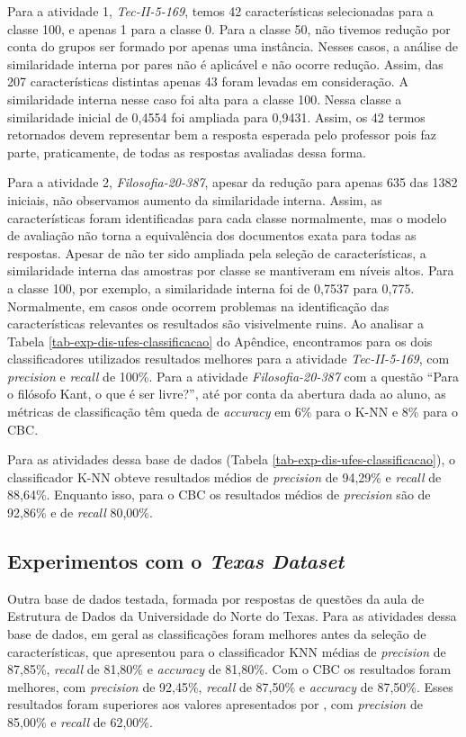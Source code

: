 Para a atividade 1, \textit{Tec-II-5-169}, temos  42 características selecionadas para a classe 100, e apenas 1 para a classe 0. Para a classe 50, não tivemos redução por conta do grupos ser formado por apenas uma instância. Nesses casos, a análise de similaridade interna por pares não é aplicável e não ocorre redução. Assim, das 207 características distintas apenas 43 foram levadas em consideração. A similaridade interna nesse caso foi alta para a classe 100. Nessa classe a similaridade inicial de 0,4554 foi ampliada para 0,9431. Assim, os 42 termos retornados devem representar bem a resposta esperada pelo professor pois faz parte, praticamente, de todas as respostas avaliadas dessa forma.

Para a atividade 2, \textit{Filosofia-20-387}, apesar da redução para apenas 635 das 1382 iniciais, não observamos aumento da similaridade interna. Assim, as características foram identificadas para cada classe normalmente, mas o modelo de avaliação não torna a equivalência dos documentos exata para todas as respostas. Apesar de não ter sido ampliada pela seleção de características, a similaridade interna das amostras por classe se mantiveram em níveis altos. Para a classe 100, por exemplo, a similaridade interna foi de 0,7537 para 0,775. Normalmente, em casos onde ocorrem problemas na identificação das características relevantes os resultados são visivelmente ruins. Ao analisar a Tabela \ref{tab-exp-dis-ufes-classificacao} do Apêndice, encontramos para os dois classificadores utilizados resultados melhores para a atividade \textit{Tec-II-5-169}, com \textit{precision} e \textit{recall} de 100\%. Para a atividade \textit{Filosofia-20-387} com a questão ``Para o filósofo Kant, o que é ser livre?'', até por conta da abertura dada ao aluno, as métricas de classificação têm queda de \textit{accuracy} em 6\% para o K-NN e 8\% para o CBC.

Para as atividades dessa base de dados (Tabela \ref{tab-exp-dis-ufes-classificacao}), o classificador K-NN obteve resultados médios de \textit{precision} de 94,29\% e \textit{recall} de 88,64\%. Enquanto isso, para o CBC os resultados médios de \textit{precision} são de 92,86\% e de \textit{recall} 80,00\%.

\subsection{Experimentos com o \it{Texas Dataset}}
Outra base de dados testada, formada por respostas de questões da aula de Estrutura de Dados da Universidade do Norte do Texas. Para as atividades dessa base de dados, em geral as classificações foram melhores antes da seleção de características, que apresentou para o classificador KNN médias de \textit{precision} de 87,85\%, \textit{recall} de 81,80\% e \textit{accuracy} de 81,80\%. Com o CBC os resultados foram melhores, com \textit{precision} de 92,45\%, \textit{recall} de 87,50\% e \textit{accuracy} de 87,50\%. Esses resultados foram superiores aos valores apresentados por \cite{mohler2011}, com \textit{precision} de 85,00\% e \textit{recall} de 62,00\%.

